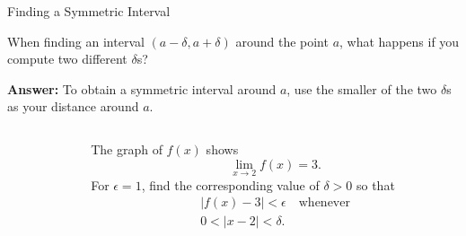 \documentclass[cal1spr16Lectures.tex]{subfiles}
\begin{document}
\begin{frame}{\small Finding a Symmetric Interval}
\begin{que}When finding an interval $(a-\delta, a+\delta)$ around the point $a$, what happens if you compute two different $\delta$s?\end{que}  
{\bf Answer:}  To obtain a symmetric interval around $a$, use the smaller of the two $\delta$s as your distance around $a$.
\end{frame}

\begin{frame}\footnotesize
\begin{exe}
\vspace{0.75pc}
\begin{columns}[T]
	\begin{column}{.4\textwidth}
	\end{column}
	\begin{column}{.55\textwidth}
		The graph of $f(x)$ shows 
		\[\lim_{x \to 2}f(x)=3.\] 
		For $\epsilon=1$, find the corresponding value of $\delta>0$ so that
		\begin{multline*}|f(x)-3|<\epsilon\quad\text{whenever} \\
			0<|x-2|<\delta.\end{multline*}  
	\end{column}
\end{columns}
\end{exe}
\end{frame}
\end{document}
